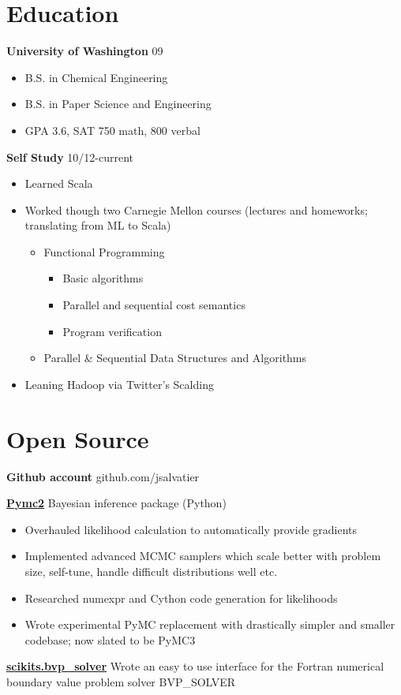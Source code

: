 \documentclass[margin]{res}
\newcommand{\bactivity}[3]{
  {\bf #1} #2 \hfill #3
    \vspace{6pt}
    \begin{itemize} \itemsep -2pt
      }
\newcommand{\eactivity}[0]{\end{itemize}}
\newcommand{\bitem}{\begin{itemize} \itemsep -2pt}
\newcommand{\eitem}{\end{itemize} }
\begin{document}
\begin{resume}
\section{Education} 
  \bactivity{University of Washington}{}{09}
      \item B.S. in Chemical Engineering
      \item B.S. in Paper Science and Engineering
      \item GPA 3.6, SAT 750 math, 800 verbal
  \eactivity
  \bactivity{Self Study}{}{10/12-current}
      \item Learned Scala 
      \item Worked though two Carnegie Mellon courses (lectures and homeworks; translating from ML to Scala)
      \bitem
        \item Functional Programming 
        \bitem
            \item Basic algorithms
            \item Parallel and sequential cost semantics
            \item Program verification
        \eitem
        \item Parallel \& Sequential Data Structures and Algorithms 
      \eitem
      \item Leaning Hadoop via Twitter's Scalding
    \eactivity
    
   
  \section{Open Source}
    {\bf Github account} github.com/jsalvatier 

    \bactivity{\href{https://github.com/pymc-devs/pymc\#readme}{Pymc2} }{Bayesian inference package (Python)}{}
      \item Overhauled likelihood calculation to automatically provide gradients 
      \item Implemented advanced MCMC samplers which scale better with problem size, self-tune, handle difficult distributions well etc.
      \item Researched numexpr and Cython code generation for likelihoods
      \item Wrote experimental PyMC replacement with drastically simpler and smaller codebase; now slated to be PyMC3
    \eactivity

    {\bf \href{packages.python.org/scikits.bvp\_solver}{scikits.bvp\_solver}} Wrote an easy to use interface for the Fortran numerical \\
      boundary value problem solver BVP\_SOLVER \\ 

\end{resume} 
\end{document}
